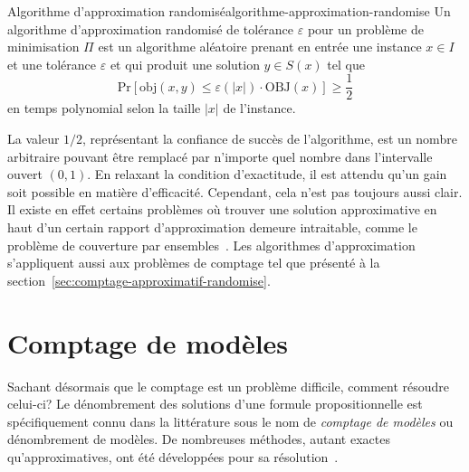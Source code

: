 \begin{subtheorem}{Algorithme d'approximation randomisé}{algorithme-approximation-randomise}
    Un algorithme d'approximation randomisé de tolérance $\varepsilon$ pour un problème de minimisation $\Pi$ est un algorithme aléatoire prenant en entrée une instance $x \in I$ et une tolérance $\varepsilon$ et qui produit une solution $y \in S(x)$ tel que
    \begin{equation*}
        \mathrm{ Pr } [\text{obj}(x, y) \leq \varepsilon(\lvert x \rvert ) \cdot \text{OBJ}(x)] \geq \frac{1}{2}
    \end{equation*}
    en temps polynomial selon la taille $\lvert x \rvert $ de l'instance.
\end{subtheorem}

La valeur $1/2$, représentant la confiance de succès de l'algorithme, est un nombre arbitraire pouvant être remplacé par n’importe quel nombre dans l’intervalle ouvert $(0, 1)$. En relaxant la condition d'exactitude, il est attendu qu'un gain soit possible en matière d'efficacité. Cependant, cela n'est pas toujours aussi clair. Il existe en effet certains problèmes où trouver une solution approximative en haut d'un certain rapport d'approximation demeure intraitable, comme le problème de couverture par ensembles~\cite{lundHardnessApproximatingMinimization1994}. Les algorithmes d'approximation s'appliquent aussi aux problèmes de comptage tel que présenté à la section~\ref{sec:comptage-approximatif-randomise}.


\section{Comptage de modèles}
\label{sec:comptage-de-modeles}

Sachant désormais que le comptage est un problème difficile, comment résoudre celui-ci? Le dénombrement des solutions d'une formule propositionnelle est spécifiquement connu dans la littérature sous le nom de \textit{comptage de modèles} ou dénombrement de modèles. De nombreuses méthodes, autant exactes qu'approximatives, ont été développées pour sa résolution~\cite{biereHandbookSatisfiability2009}. 

